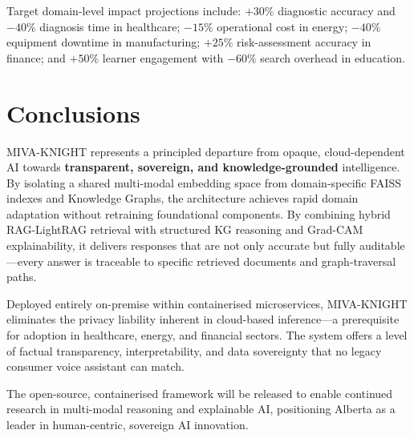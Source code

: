 \documentclass[12pt,a4paper]{article}
\begin{document}
Target domain-level impact projections include: $+30\%$ diagnostic accuracy and
$-40\%$ diagnosis time in healthcare; $-15\%$ operational cost in energy;
$-40\%$ equipment downtime in manufacturing; $+25\%$ risk-assessment accuracy
in finance; and $+50\%$ learner engagement with $-60\%$ search overhead in education.

\section*{Conclusions}

MIVA-KNIGHT represents a principled departure from opaque, cloud-dependent AI towards
\textbf{transparent, sovereign, and knowledge-grounded} intelligence. By isolating a
shared multi-modal embedding space from domain-specific FAISS indexes and Knowledge
Graphs, the architecture achieves rapid domain adaptation without retraining foundational
components. By combining hybrid RAG-LightRAG retrieval with structured KG reasoning and
Grad-CAM explainability, it delivers responses that are not only accurate but fully
auditable---every answer is traceable to specific retrieved documents and graph-traversal
paths.

Deployed entirely on-premise within containerised microservices, MIVA-KNIGHT eliminates
the privacy liability inherent in cloud-based inference---a prerequisite for adoption in
healthcare, energy, and financial sectors. The system offers a level of factual
transparency, interpretability, and data sovereignty that no legacy consumer voice
assistant can match.

The open-source, containerised framework will be released to enable continued research
in multi-modal reasoning and explainable AI, positioning Alberta as a leader in
human-centric, sovereign AI innovation.
\end{document}
